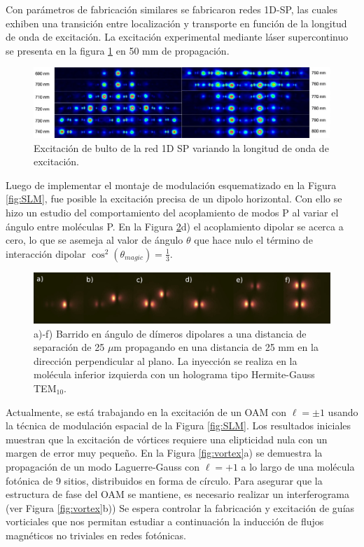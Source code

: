 \documentclass[12pt, letterpaper]{article}
\begin{document}
Con parámetros de fabricación similares se fabricaron redes 1D-SP, las cuales exhiben una transición entre localización y transporte en función de la longitud de onda de excitación. La excitación experimental mediante láser supercontinuo se presenta en la figura \ref{fig:super} en 50 mm de propagación.

\begin{figure}[H]
	\centering
	\includegraphics[width=1.0\linewidth]{./media/SP1D.jpg}
	\caption{Excitación de bulto de la red 1D SP variando la longitud de onda de excitación. \label{fig:super}}
\end{figure}

Luego de implementar el montaje de modulación esquematizado en la Figura \ref{fig:SLM}, fue posible la excitación precisa de un dipolo horizontal. Con ello se hizo un estudio del comportamiento del acoplamiento de modos P al variar el ángulo entre moléculas P. En la Figura \ref{fig:dipoles}d) el acoplamiento dipolar se acerca a cero, lo que se asemeja al valor de ángulo $\theta$ que hace nulo el término de interacción dipolar $\cos^2(\theta_{magic}) = \frac{1}{3}$.  

\begin{figure}[H]
	\centering
	\includegraphics[width=0.9\linewidth]{./media/dipoles.jpg}
	\caption{a)-f) Barrido en ángulo de dímeros dipolares a una distancia de separación de 25 $\mu$m propagando en una distancia de 25 mm en la dirección perpendicular al plano. La inyección se realiza en la molécula inferior izquierda con un holograma tipo Hermite-Gauss TEM$_{10}$. \label{fig:dipoles}}
\end{figure}

Actualmente, se está trabajando en la excitación de un OAM con $\ell = \pm 1$ usando la técnica de modulación espacial de la Figura \ref{fig:SLM}. Los resultados iniciales muestran que la excitación de vórtices requiere una elipticidad nula con un margen de error muy pequeño. En la Figura \ref{fig:vortex}a) se demuestra la propagación de un modo Laguerre-Gauss con $\ell = +1$ a lo largo de una molécula fotónica de 9 sitios, distribuidos en forma de círculo. Para asegurar que la estructura de fase del OAM se mantiene, es necesario realizar un interferograma (ver Figura \ref{fig:vortex}b)) Se espera controlar la fabricación y excitación de guías vorticiales que nos permitan estudiar a continuación la inducción de flujos magnéticos no triviales en redes fotónicas.
\end{document}
